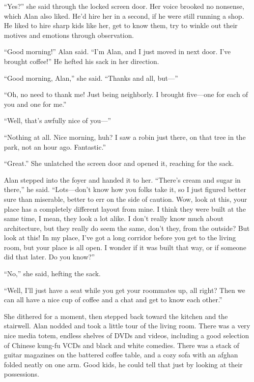 ``Yes?'' she said through the locked screen door.  Her voice brooked
no nonsense, which Alan also liked.  He'd hire her in a second, if he
were still running a shop.  He liked to hire sharp kids like her, get
to know them, try to winkle out their motives and emotions through
observation.

``Good morning!'' Alan said.  ``I'm Alan, and I just moved in next
door.  I've brought coffee!'' He hefted his sack in her direction.

``Good morning, Alan,'' she said.  ``Thanks and all, but---''

``Oh, no need to thank me!  Just being neighborly.  I brought
five---one for each of you and one for me.''

``Well, that's awfully nice of you---''

``Nothing at all.  Nice morning, huh?  I saw a robin just there, on
that tree in the park, not an hour ago.  Fantastic.''

``Great.'' She unlatched the screen door and opened it, reaching for
the sack.

Alan stepped into the foyer and handed it to her.  ``There's cream and
sugar in there,'' he said.  ``Lots---don't know how you folks take it,
so I just figured better sure than miserable, better to err on the
side of caution.  Wow, look at this, your place has a completely
different layout from mine.  I think they were built at the same time,
I mean, they look a lot alike.  I don't really know much about
architecture, but they really do seem the same, don't they, from the
outside?  But look at this!  In my place, I've got a long corridor
before you get to the living room, but your place is all open.  I
wonder if it was built that way, or if someone did that later.  Do you
know?''

``No,'' she said, hefting the sack.

``Well, I'll just have a seat while you get your roommates up, all
right?  Then we can all have a nice cup of coffee and a chat and get
to know each other.''

She dithered for a moment, then stepped back toward the kitchen and
the stairwell.  Alan nodded and took a little tour of the living room. 
There was a very nice media totem, endless shelves of DVDs and videos,
including a good selection of Chinese kung-fu VCDs and black and white
comedies.  There was a stack of guitar magazines on the battered
coffee table, and a cozy sofa with an afghan folded neatly on one arm. 
Good kids, he could tell that just by looking at their possessions.

